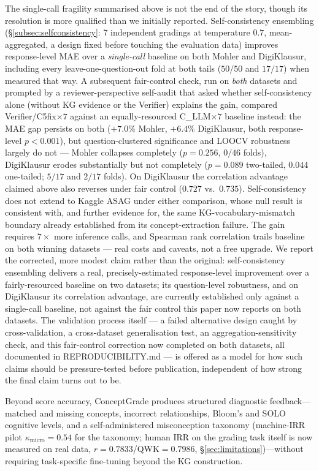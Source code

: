\documentclass[conference]{IEEEtran}
\begin{document}
The single-call fragility summarised above is not the end of the story,
though its resolution is more qualified than we initially reported.
Self-consistency ensembling (\S\ref{subsec:selfconsistency}: 7
independent gradings at temperature $0.7$, mean-aggregated, a design
fixed before touching the evaluation data) improves response-level MAE
over a \emph{single-call} baseline on both Mohler and DigiKlausur,
including every leave-one-question-out fold at both tails ($50/50$ and
$17/17$) when measured that way. A subsequent fair-control check, run
on \emph{both} datasets and prompted by a reviewer-perspective
self-audit that asked whether self-consistency alone (without KG
evidence or the Verifier) explains the gain, compared
Verifier/C5fix$\times7$ against an equally-resourced C\_LLM$\times7$
baseline instead: the MAE gap persists on both ($+7.0\%$ Mohler,
$+6.4\%$ DigiKlausur, both response-level $p<0.001$), but
question-clustered significance and LOOCV robustness largely do not ---
Mohler collapses completely ($p=0.256$, $0/46$ folds), DigiKlausur
erodes substantially but not completely ($p=0.089$ two-tailed, $0.044$
one-tailed; $5/17$ and $2/17$ folds). On DigiKlausur the correlation
advantage claimed above also reverses under fair control ($0.727$ vs.\
$0.735$). Self-consistency does not extend to
Kaggle ASAG under either comparison, whose null result is consistent
with, and further evidence for, the same KG-vocabulary-mismatch
boundary already established from its concept-extraction failure. The
gain requires $7\times$ more inference calls, and Spearman rank
correlation trails baseline on both winning datasets --- real
costs and caveats, not a free upgrade. We report the corrected, more
modest claim rather than the original: self-consistency ensembling
delivers a real, precisely-estimated response-level improvement over a
fairly-resourced baseline on two datasets; its question-level
robustness, and on DigiKlausur its correlation advantage, are currently
established only against a single-call baseline, not against the fair
control this paper now reports on both datasets. The validation
process itself --- a failed alternative design caught by
cross-validation, a cross-dataset generalisation test, an
aggregation-sensitivity check, and this fair-control correction now
completed on both datasets, all
documented in REPRODUCIBILITY.md --- is offered as a model for how such
claims should be pressure-tested before publication, independent of how
strong the final claim turns out to be.

Beyond score accuracy, ConceptGrade produces structured diagnostic feedback---matched
and missing concepts, incorrect relationships, Bloom's and SOLO cognitive levels,
and a self-administered misconception taxonomy (machine-IRR pilot
$\kappa_{\text{micro}} = 0.54$ for the taxonomy; human IRR on the grading
task itself is now measured on real data, $r=0.7833$/QWK$=0.7986$,
\S\ref{sec:limitations})---without requiring
task-specific fine-tuning beyond the KG construction.
\end{document}
